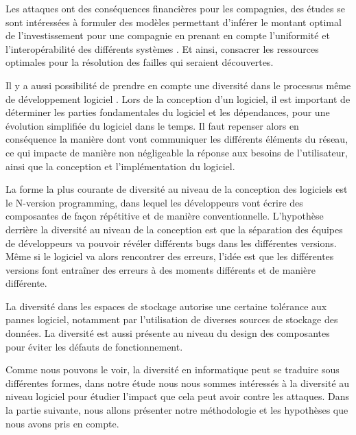 Les attaques ont des conséquences financières pour les compagnies, des études se sont intéressées à formuler des modèles permettant d’inférer le montant optimal de l’investissement pour une compagnie en prenant en compte l’uniformité et l’interopérabilité des différents systèmes \cite{informationSecurity}. Et ainsi, consacrer les ressources optimales pour la résolution des failles qui seraient découvertes. 

Il y a aussi possibilité de prendre en compte une diversité dans le processus même de développement logiciel \cite{processDiversity}. 
Lors de la conception d’un logiciel, il est important de déterminer les parties fondamentales du logiciel et les dépendances, pour une évolution simplifiée du logiciel dans le temps. Il faut repenser alors en conséquence la manière dont vont communiquer les différents éléments du réseau, ce qui impacte de manière non négligeable la réponse aux besoins de l'utilisateur, ainsi que la conception et l'implémentation du logiciel.

La forme la plus courante de diversité au niveau de la conception des logiciels est le N-version programming\cite{ NversionProgramming }, dans lequel les développeurs vont écrire des composantes de façon répétitive et de manière conventionnelle. L’hypothèse derrière la diversité au niveau de la conception est que la séparation des équipes de développeurs va pouvoir révéler différents bugs dans les différentes versions. Même si le logiciel va alors rencontrer des erreurs, l’idée est que les différentes versions font entraîner des erreurs à des moments différents et de manière différente. 

La diversité dans les espaces de stockage autorise une certaine tolérance aux pannes logiciel\cite{dataDiversity}, notamment par l'utilisation de diverses sources de stockage des données. La diversité est aussi présente au niveau du design des composantes pour éviter les défauts de fonctionnement\cite{SecurityThroughDiversity}.

Comme nous pouvons le voir, la diversité en informatique peut se traduire sous différentes formes, dans notre étude nous nous sommes intéressés à la diversité au niveau logiciel pour étudier l'impact que cela peut avoir contre les attaques. Dans la partie suivante, nous allons présenter notre méthodologie et les hypothèses que nous avons pris en compte. 